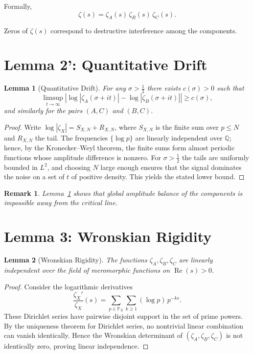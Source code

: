 \documentclass[11pt]{article}
\newtheorem{lemma}{Lemma}
\newtheorem{remark}{Remark}
\newcommand{\Rea}{\operatorname{Re}}
\newcommand{\zA}{\zeta_A}
\newcommand{\zB}{\zeta_B}
\newcommand{\zC}{\zeta_C}
\begin{document}
Formally,
\[
\zeta(s)=\zA(s)\,\zB(s)\,\zC(s).
\]

Zeros of $\zeta(s)$ correspond to destructive interference among the components.

\section{Lemma 2': Quantitative Drift}

\begin{lemma}[Quantitative Drift]\label{lem:drift}
For any $\sigma> \tfrac12$ there exists $c(\sigma)>0$ such that
\[
\limsup_{t\to\infty}
\left|
\log|\zA(\sigma+it)|-\log|\zB(\sigma+it)|
\right|
\ge c(\sigma),
\]
and similarly for the pairs $(A,C)$ and $(B,C)$.
\end{lemma}

\begin{proof}
Write $\log|\zeta_X|=S_{X,N}+R_{X,N}$, where $S_{X,N}$ is the finite sum over
$p\le N$ and $R_{X,N}$ the tail.
The frequencies $\{\log p\}$ are linearly independent over $\mathbb Q$; hence,
by the Kronecker--Weyl theorem, the finite sums form almost periodic functions
whose amplitude difference is nonzero.
For $\sigma>\tfrac12$ the tails are uniformly bounded in $L^2$, and choosing $N$
large enough ensures that the signal dominates the noise on a set of $t$ of
positive density. This yields the stated lower bound.
\end{proof}

\begin{remark}
Lemma~\ref{lem:drift} shows that global amplitude balance of the components is
impossible away from the critical line.
\end{remark}

\section{Lemma 3: Wronskian Rigidity}

\begin{lemma}[Wronskian Rigidity]\label{lem:wronski}
The functions $\zA,\zB,\zC$ are linearly independent over the field of meromorphic
functions on $\Rea(s)>0$.
\end{lemma}

\begin{proof}
Consider the logarithmic derivatives
\[
\frac{\zeta_X'}{\zeta_X}(s)=\sum_{p\in\mathbb P_X}\sum_{k\ge1}(\log p)\,p^{-ks}.
\]
These Dirichlet series have pairwise disjoint support in the set of prime powers.
By the uniqueness theorem for Dirichlet series, no nontrivial linear combination
can vanish identically. Hence the Wronskian determinant of $(\zA,\zB,\zC)$ is not
identically zero, proving linear independence.
\end{proof}
\end{document}

